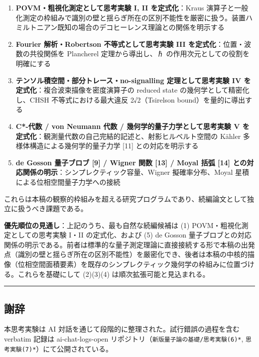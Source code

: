 \documentclass[
  11pt,
]{ltjsarticle}
\providecommand{\tightlist}{%
  \setlength{\itemsep}{0pt}\setlength{\parskip}{0pt}}
\begin{document}
\begin{enumerate}
\def\labelenumi{\arabic{enumi}.}
\tightlist
\item
  \textbf{POVM・粗視化測定として思考実験 I, II を定式化}：Kraus
  演算子と一般化測定の枠組みで識別の壁と揺らぎ所在の区別不能性を厳密に扱う。装置ハミルトニアン既知の場合のデコヒーレンス理論との関係を明示する
\item
  \textbf{Fourier 解析・Robertson 不等式として思考実験 III
  を定式化}：位置・波数の共役関係を Plancherel 定理から導出し、ℏ
  の作用次元としての役割を明確にする
\item
  \textbf{テンソル積空間・部分トレース・no-signalling 定理として思考実験
  IV を定式化}：複合波束描像を密度演算子の reduced state
  の幾何学として精密化し、CHSH 不等式における最大違反 2√2（Tsirelson
  bound）を量的に導出する
\item
  \textbf{C*-代数 / von Neumann 代数 / 幾何学的量子力学として思考実験 V
  を定式化}：観測量代数の自己完結的記述と、射影ヒルベルト空間の Kähler
  多様体構造による幾何学的量子力学 {[}11{]} との対応を明示する
\item
  \textbf{de Gosson 量子ブロブ {[}9{]} / Wigner 関数 {[}13{]} / Moyal
  括弧 {[}14{]} との対応関係の明示}：シンプレクティック容量、Wigner
  擬確率分布、Moyal 星積による位相空間量子力学への接続
\end{enumerate}

これらは本稿の観察的枠組みを超える研究プログラムであり、続編論文として独立に扱うべき課題である。

\textbf{優先順位の見通し}：上記のうち、最も自然な続編候補は (1)
POVM・粗視化測定としての思考実験 I・II の定式化、および (5) de Gosson
量子ブロブとの対応関係の明示である。前者は標準的な量子測定理論に直接接続する形で本稿の出発点（識別の壁と揺らぎ所在の区別不能性）を厳密化でき、後者は本稿の中核的描像（位相空間面積要素）を既存のシンプレクティック幾何学の枠組みに位置づける。これらを基礎にして
(2)(3)(4) は順次拡張可能と見込まれる。

\begin{center}\rule{0.5\linewidth}{0.5pt}\end{center}

\subsection{謝辞}\label{ux8b1dux8f9e}

本思考実験は AI 対話を通じて段階的に整理された。試行錯誤の過程を含む
verbatim 記録は ai-chat-logs-open
リポジトリ（\texttt{新版量子論の基礎/思考実験(6)*},
\texttt{思考実験(7)*}）にて公開されている。
\end{document}
